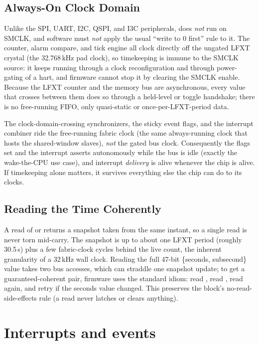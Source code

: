 \subsection{Always-On Clock Domain}

Unlike the SPI, UART, I2C, QSPI, and I3C peripherals,  does \emph{not} run on SMCLK, and software must \emph{not} apply the usual ``write  to 0 first'' rule to it. The counter, alarm compare, and tick engine all clock directly off the ungated LFXT crystal (the 32.768\,kHz pad clock), so timekeeping is immune to the SMCLK source: it keeps running through a clock reconfiguration and through power-gating of a hart, and firmware cannot stop it by clearing the SMCLK enable. Because the LFXT counter and the memory bus are asynchronous, every value that crosses between them does so through a held-level or toggle handshake; there is no free-running FIFO, only quasi-static or once-per-LFXT-period data.

The clock-domain-crossing synchronizers, the sticky event flags, and the interrupt combiner ride the free-running fabric clock (the same always-running clock that hosts the shared-window slaves), \emph{not} the gated bus clock. Consequently the flags set and the interrupt asserts autonomously while the bus is idle (exactly the wake-the-CPU use case), and interrupt \emph{delivery} is alive whenever the chip is alive. If timekeeping alone matters, it survives everything else the chip can do to its clocks.

\subsection{Reading the Time Coherently}

A read of  or  returns a snapshot taken from the same instant, so a single read is never torn mid-carry. The snapshot is up to about one LFXT period (roughly 30.5\,\textmu s) plus a few fabric-clock cycles behind the live count, the inherent granularity of a 32\,kHz wall clock. Reading the full 47-bit \{seconds, subsecond\} value takes two bus accesses, which can straddle one snapshot update; to get a guaranteed-coherent pair, firmware uses the standard idiom: read , read , read  again, and retry if the seconds value changed. This preserves the block's no-read-side-effects rule (a read never latches or clears anything).

\section{Interrupts and events}

